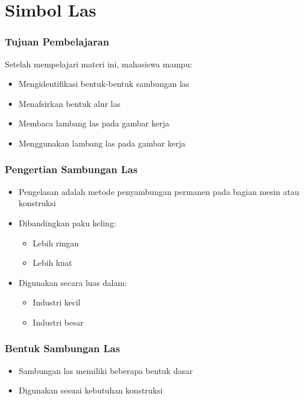 \documentclass[../gbr_teknik.tex]{subfiles}
\begin{document}
\section{Simbol Las}

\begin{frame}[mytitle=standard,t,mycolor=digiPH_white,light]\frametitle{Tujuan Pembelajaran}
	Setelah mempelajari materi ini, mahasiswa mampu:
	\begin{itemize}
		\item Mengidentifikasi bentuk-bentuk sambungan las
		\item Menafsirkan bentuk alur las
		\item Membaca lambang las pada gambar kerja
		\item Menggunakan lambang las pada gambar kerja
	\end{itemize}\end{frame}

\begin{frame}[mytitle=standard,c,mybg=bglight2,light]\frametitle{Pengertian Sambungan Las}
	\begin{itemize}
		\item Pengelasan adalah metode penyambungan permanen pada bagian mesin atau konstruksi
		\item Dibandingkan paku keling:
		      \begin{itemize}
			      \item Lebih ringan
			      \item Lebih kuat
		      \end{itemize}
		\item Digunakan secara luas dalam:
		      \begin{itemize}
			      \item Industri kecil
			      \item Industri besar
		      \end{itemize}
	\end{itemize}\end{frame}

\begin{frame}[mytitle=standard,t,mycolor=digiPH_uniblue,light]\frametitle{Bentuk Sambungan Las}
	\begin{itemize}
		\item Sambungan las memiliki beberapa bentuk dasar
		\item Digunakan sesuai kebutuhan konstruksi
	\end{itemize}\end{frame}
\end{document}
